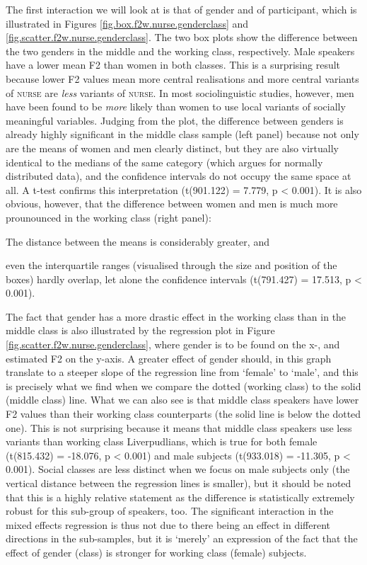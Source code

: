 The first interaction we will look at is that of gender and  of participant, which is illustrated in Figures \ref{fig.box.f2w.nurse.genderclass} and \ref{fig.scatter.f2w.nurse.genderclass}.
The two box plots show the difference between the two genders in the middle and the working class, respectively.
Male speakers have a lower mean F2 than women in both classes.
This is a surprising result because lower F2 values mean more central realisations and more central variants of \textsc{nurse} are \emph{less}  variants of \textsc{nurse}.
In most sociolinguistic studies, however, men have been found to be \emph{more} likely than women to use local variants of socially meaningful variables.
Judging from the plot, the difference between genders is already highly significant in the middle class sample (left panel) because not only are the means of women and men clearly distinct, but they are also virtually identical to the medians of the same category (which argues for normally distributed data), and the confidence intervals do not occupy the same space at all.
A t-test confirms this interpretation (t(901.122) = 7.779, p < 0.001).
It is also obvious, however, that the difference between women and men is much more prounounced in the working class (right panel):
\begin{inparaenum}[(a)]
	\item The distance between the means is considerably greater, and
	\item even the interquartile ranges (visualised through the size and position of the boxes) hardly overlap, let alone the confidence intervals (t(791.427) = 17.513, p < 0.001).
\end{inparaenum}

The fact that gender has a more drastic effect in the working class than in the middle class is also illustrated by the regression plot in Figure \ref{fig.scatter.f2w.nurse.genderclass}, where gender is to be found on the x-, and estimated F2 on the y-axis.
A greater effect of gender should, in this graph translate to a steeper slope of the regression line from `female' to `male', and this is precisely what we find when we compare the dotted (working class) to the solid (middle class) line.
What we can also see is that middle class speakers have lower F2 values than their working class counterparts (the solid line is below the dotted one).
This is not surprising because it means that middle class speakers use less  variants than working class Liverpudlians, which is true for both female (t(815.432) = -18.076, p < 0.001) and male subjects (t(933.018) = -11.305, p < 0.001).
Social classes are less distinct when we focus on male subjects only (the vertical distance between the regression lines is smaller), but it should be noted that this is a highly relative statement as the difference is statistically extremely robust for this sub-group of speakers, too.
The significant interaction in the mixed effects regression is thus not due to there being an effect in different directions in the sub-samples, but it is `merely' an expression of the fact that the effect of gender (class) is stronger for working class (female) subjects.


